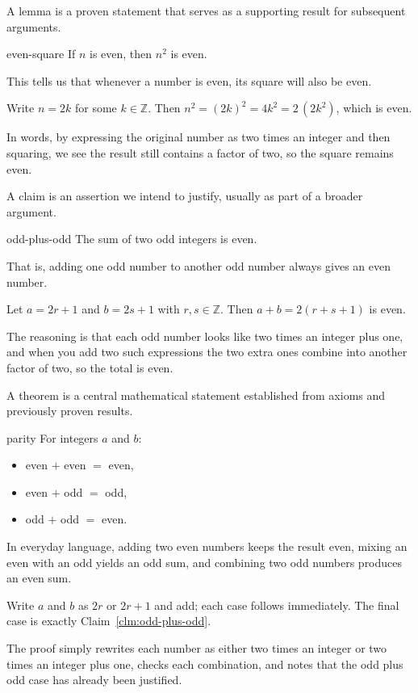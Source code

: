 \documentclass[11pt,a4paper]{article}
\begin{document}
A lemma is a proven statement that serves as a supporting result for subsequent arguments.
\begin{lemma}{}{even-square}
If $n$ is even, then $n^2$ is even.
\end{lemma}
This tells us that whenever a number is even, its square will also be even.
	
\begin{proofbox}{}{}
Write $n=2k$ for some $k\in\mathbb{Z}$. Then $n^2=(2k)^2=4k^2=2\,(2k^2)$, which is even.
\end{proofbox}
In words, by expressing the original number as two times an integer and then squaring, we see the result still contains a factor of two, so the square remains even.

A claim is an assertion we intend to justify, usually as part of a broader argument.
\begin{claim}{}{odd-plus-odd}
The sum of two odd integers is even.
\end{claim}
That is, adding one odd number to another odd number always gives an even number.

\begin{proofbox}{}{}
Let $a=2r+1$ and $b=2s+1$ with $r,s\in\mathbb{Z}$. Then $a+b=2(r+s+1)$ is even.
\end{proofbox}
The reasoning is that each odd number looks like two times an integer plus one, and when you add two such expressions the two extra ones combine into another factor of two, so the total is even.

A theorem is a central mathematical statement established from axioms and previously proven results.
\begin{theorem}{}{parity}
For integers $a$ and $b$:
\begin{itemize}
  \item even $+$ even $=$ even,
  \item even $+$ odd $=$ odd,
  \item odd $+$ odd $=$ even.
\end{itemize}
\end{theorem}
In everyday language, adding two even numbers keeps the result even, mixing an even with an odd yields an odd sum, and combining two odd numbers produces an even sum.

\begin{proofbox}{}{}
Write $a$ and $b$ as $2r$ or $2r+1$ and add; each case follows immediately. The final case is exactly Claim~\ref{clm:odd-plus-odd}.
\end{proofbox}
The proof simply rewrites each number as either two times an integer or two times an integer plus one, checks each combination, and notes that the odd plus odd case has already been justified.
\end{document}
